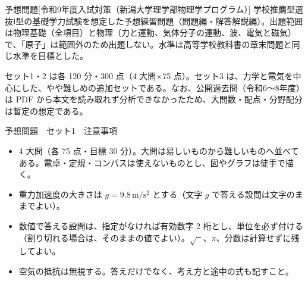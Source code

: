 \documentclass[paper=b5, fontsize=8pt, fleqn, twoside]{jlreq}
\begin{document}
\newcommand{\unit}[1]{\,\mathrm{#1}}                              %
\newcommand{\ans}{\hspace{\zw}\textgt{……(答)}}                      %
\newcommand{\ansm}{\hspace{\zw}\text{\textgt{……(答)}}}              %
\newcommand{\pts}[1]{\nobreak\hfill\textgt{\mbox{［#1点］}}}               %
\newcommand{\bigpart}[1]{\par\noindent\textbf{【#1】}\ }
\newcommand{\bpart}[1]{\textbf{【#1】}\ }
\begin{ptbs}{予想問題}[令和9年度入試対策（新潟大学理学部物理学プログラム）]
学校推薦型選抜Ⅰ型の基礎学力試験を想定した予想練習問題（問題編・解答解説編）。出題範囲は物理基礎（全項目）と物理（力と運動、気体分子の運動、波、電気と磁気）で、「原子」は範囲外のため出題しない。水準は高等学校教科書の章末問題と同じ水準を目標とした。
\par
セット1・2 は各 120 分・300 点（4 大問×75 点）。セット3 は、力学と電気を中心にした、やや難しめの追加セットである。なお、公開過去問（令和6〜8年度）は PDF から本文を読み取れず分析できなかったため、大問数・配点・分野配分は暫定の想定である。
\end{ptbs}
\begin{simple}[120分・300点]{予想問題　セット1　注意事項}
\begin{itemize}[leftmargin=1.2\zw,itemsep=0pt,topsep=1pt,parsep=0pt]
\item 4 大問（各 75 点・目標 30 分）。大問は易しいものから難しいものへ並べてある。電卓・定規・コンパスは使えないものとし、図やグラフは徒手で描く。
\item 重力加速度の大きさは $g=9.8\unit{m/s^2}$ とする（文字 $g$ で答える設問は文字のままでよい）。
\item 数値で答える設問は、指定がなければ有効数字 2 桁とし、単位を必ず付ける（割り切れる場合は、そのままの値でよい）。$\sqrt{\phantom{x}}$、$\pi$、分数は計算せずに残してよい。
\item 空気の抵抗は無視する。答えだけでなく、考え方と途中の式も記すこと。
\end{itemize}
\end{simple}
\end{document}
